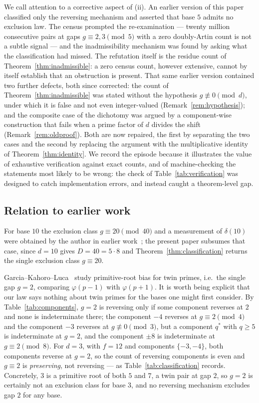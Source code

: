 \documentclass[11pt,reqno]{amsart}
\theoremstyle{plain}
\theoremstyle{definition}
\begin{document}
We call attention to a corrective aspect of (ii). An earlier version of this
paper classified only the reversing mechanism and asserted that base $5$
admits no exclusion law. The census prompted the re-examination --- twenty million consecutive pairs at
gaps $g \equiv 2, 3 \pmod 5$ with a zero doubly-Artin count is not a subtle
signal --- and the inadmissibility mechanism was found by asking what the
classification had missed. The refutation itself is the residue count of
Theorem~\ref{thm:inadmissible}: a zero census count, however extensive, cannot
by itself establish that an obstruction is present. That same earlier version
contained two further defects, both since corrected: the count of
Theorem~\ref{thm:inadmissible} was stated without the hypothesis
$g \not\equiv 0 \pmod d$, under which it is false and not even
integer-valued (Remark~\ref{rem:hypothesis}); and the composite case of the
dichotomy was argued by a component-wise construction that fails when a prime
factor of $d$ divides the shift (Remark~\ref{rem:oldproof}). Both are now
repaired, the first by separating the two cases and the second by replacing
the argument with the multiplicative identity of Theorem~\ref{thm:identity}.
We record the episode because it illustrates the value of exhaustive
verification against exact counts, and of machine-checking the statements most
likely to be wrong: the check of Table~\ref{tab:verification} was designed to
catch implementation errors, and instead caught a theorem-level gap.

\subsection*{Relation to earlier work}
For base $10$ the exclusion class $g \equiv 20 \pmod{40}$ and a measurement of
$\delta(10)$ were obtained by the author in earlier
work~\cite{BaldConsecutive}; the present paper
subsumes that case, since $d = 10$ gives $D = 40 = 5 \cdot 8$ and
Theorem~\ref{thm:classification} returns the single exclusion class
$g \equiv 20$.

Garcia--Kahoro--Luca~\cite{GarciaKahoroLuca2019} study primitive-root bias for
twin primes, i.e.\ the single gap $g = 2$, comparing $\varphi(p-1)$ with
$\varphi(p+1)$. It is worth being explicit that our law says nothing about
twin primes for the bases one might first consider. By
Table~\ref{tab:components}, $g = 2$ is reversing only if some component
reverses at $2$ and none is indeterminate there; the component $-4$ reverses
at $g \equiv 2 \pmod 4$ and the component $-3$ reverses at $g \not\equiv 0
\pmod 3$, but a component $q^*$ with $q \ge 5$ is indeterminate at $g = 2$,
and the component $\pm 8$ is indeterminate at $g \equiv 2 \pmod 8$. For
$d = 3$, with $f = 12$ and components $\{-3, -4\}$, both components reverse at
$g = 2$, so the count of reversing components is even and $g \equiv 2$ is
\emph{preserving}, not reversing --- as Table~\ref{tab:classification} records.
Concretely, $3$ is a primitive root of both $5$ and $7$, a twin pair at gap
$2$, so $g = 2$ is certainly not an exclusion class for base $3$, and no
reversing mechanism excludes gap $2$ for any base.
\end{document}

